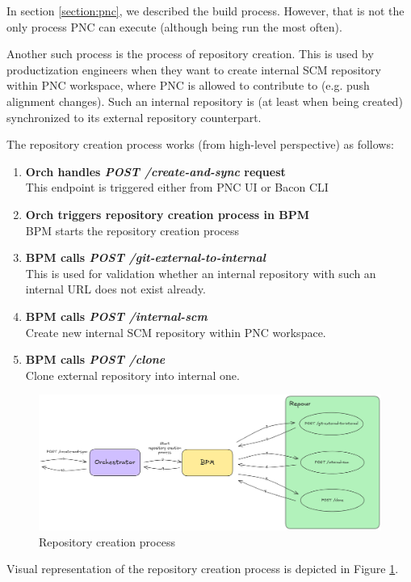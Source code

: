 \documentclass[../main.tex]{subfiles}
\begin{document}
In section \ref{section:pnc}, we described the build process. However, that is not the only process PNC can execute (although being run the most often).

Another such process is the process of repository creation. This is used by productization engineers when they want to create internal SCM repository within PNC workspace, where PNC is allowed to contribute to (e.g. push alignment changes). Such an internal repository is (at least when being created) synchronized to its external repository counterpart.

The repository creation process works (from high-level perspective) as follows:

\begin{enumerate}
    \item \textbf{Orch handles \textit{POST /create-and-sync} request}\\
    This endpoint is triggered either from PNC UI or Bacon CLI

    \item \textbf{Orch triggers repository creation process in BPM}\\
    BPM starts the repository creation process

    \item \textbf{BPM calls \textit{POST /git-external-to-internal}}\\
    This is used for validation whether an internal repository with such an internal URL does not exist already.

    \item \textbf{BPM calls \textit{POST /internal-scm}}\\
    Create new internal SCM repository within PNC workspace.

    \item \textbf{BPM calls \textit{\textit{POST /clone}}}\\
    Clone external repository into internal one.
\end{enumerate}

\begin{figure}
  \begin{center}
    \includegraphics[width=\textwidth]{images/repository-creation-process.png}
  \end{center}
  \caption{Repository creation process}
  \label{fig:repository-creation-process}
\end{figure}

Visual representation of the repository creation process is depicted in Figure \ref{fig:repository-creation-process}.
\end{document}
